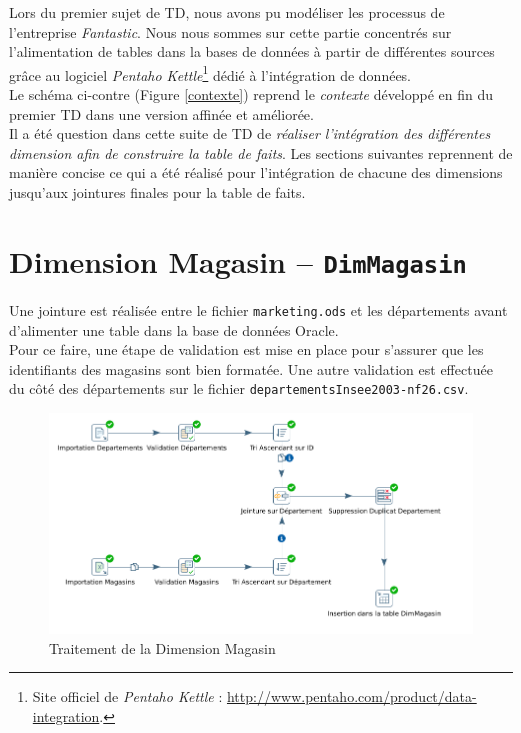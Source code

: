 Lors du premier sujet de TD, nous avons pu modéliser les processus de l'entreprise \textit{Fantastic}. Nous nous sommes sur cette partie concentrés sur l'alimentation de tables dans la bases de données à partir de différentes sources grâce au logiciel \textit{Pentaho Kettle}\footnote{Site officiel de \textit{Pentaho Kettle} : \url{http://www.pentaho.com/product/data-integration}.} dédié à l'intégration de données.\\

Le schéma ci-contre (Figure \ref{contexte}) reprend le \textit{contexte} développé en fin du premier TD dans une version affinée et améliorée.\\

Il a été question dans cette suite de TD de \textit{réaliser l'intégration des différentes dimension afin de construire la table de faits}. Les sections suivantes reprennent de manière concise ce qui a été réalisé  pour l'intégration de chacune des dimensions jusqu'aux jointures finales pour la table de faits.
  	

\section{Dimension Magasin -- \texttt{DimMagasin}}

Une jointure est réalisée entre le fichier \texttt{marketing.ods} et les départements avant d'alimenter une table dans la base de données Oracle.\\

Pour ce faire, une étape de validation est mise en place pour s'assurer que les identifiants des magasins sont bien formatée. Une autre validation est effectuée du côté des départements sur le fichier \texttt{departementsInsee2003-nf26.csv}.

	\begin{figure}[H]
      \centerline{\includegraphics[width=\textwidth]{../TD2/screenshots/screenScriptDimMagasin.png}}
      \caption{Traitement de la Dimension Magasin}
      \label{magasin}
  	\end{figure}
  	

